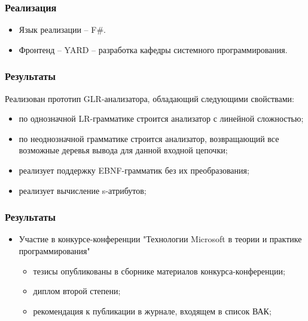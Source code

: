 \documentclass{beamer}
\begin{document}
\begin{frame}
	\transwipe[direction=90]
	\frametitle{Реализация}
	\begin{itemize}
		\item Язык реализации -- F\#.
    \item Фронтенд -- YARD -- разработка кафедры системного программирования.   
	\end{itemize}	
\end{frame}


\begin{frame}
	\transwipe[direction=90]
	\frametitle{Результаты}
	Реализован прототип GLR-анализатора, обладающий следующими свойствами:
	\begin{itemize}
		\item по однозначной LR-грамматике строится анализатор с линейной сложностью;
    \item по неоднозначной грамматике строится анализатор, возвращающий все возможные деревья вывода для данной входной цепочки;
    \item реализует поддержку EBNF-грамматик без их преобразования;
    \item реализует вычисление s-атрибутов;
	\end{itemize}	
\end{frame}

\begin{frame}
	\transwipe[direction=90]
	\frametitle{Результаты}
\begin{itemize}
	\item  Участие в конкурсе-конференции "Технологии Microsoft в теории и практике программирования"
	\begin{itemize}
		\item тезисы опубликованы в сборнике материалов конкурса-конференции;
    \item диплом второй степени;
    \item рекомендация к публикации в журнале, входящем в список ВАК;
	\end{itemize}	
\end{itemize}	
\end{frame}
\end{document}
